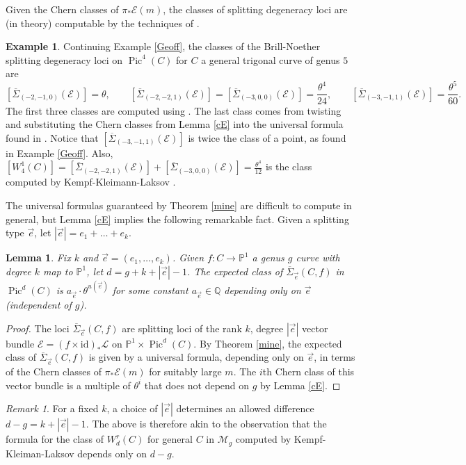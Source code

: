 \documentclass[12pt]{amsart}
\newcommand{\qq}{\mathbb{Q}}
\newcommand{\pp}{\mathbb{P}}
\newcommand{\E}{\mathcal{E}}
\renewcommand{\L}{\mathcal{L}}
\newcommand{\M}{\mathcal{M}}
\newtheorem{Lemma}[theorem]{Lemma}
\DeclareMathOperator{\Pic}{Pic}
\newcommand{\Sigmabar}{\overline{\Sigma}}
\theoremstyle{definition}
\newtheorem{Example}[theorem]{Example}
\theoremstyle{remark}
\newtheorem*{remark}{Remark}
\theoremstyle{remark}
\numberwithin{equation}{section}
\begin{document}
Given the Chern classes of $\pi_*\E(m)$, the classes of splitting degeneracy loci are (in theory) computable by the techniques of \cite{L}.
\begin{Example} \label{revisit}
Continuing Example \ref{Geoff}, the classes of the Brill-Noether splitting degeneracy loci on $\Pic^4(C)$ for $C$ a general trigonal curve of genus $5$ are
\[[\Sigmabar_{(-2, -1, 0)}(\E)] = \theta, \qquad [\Sigmabar_{(-2, -2, 1)}(\E)] = [\Sigmabar_{(-3, 0, 0)}(\E)] = \frac{\theta^4}{24}, \qquad [\Sigmabar_{(-3, -1, 1)}(\E)] = \frac{\theta^5}{60}.\]
The first three classes are computed using \cite[Lemma 5.1]{L}. The last class comes from twisting and substituting the Chern classes from Lemma \ref{cE} into the universal formula found in \cite[Example 6.2]{L}. Notice that $[\Sigmabar_{(-3, -1, 1)}(\E)]$ is twice the class of a point, as found in Example \ref{Geoff}.
Also, $[W^1_4(C)] = [\Sigmabar_{(-2, -2, 1)}(\E)] + [\Sigmabar_{(-3, 0, 0)}(\E)] = \frac{\theta^4}{12}$ is the class computed by Kempf-Kleimann-Laksov \cite{K, KL1, KL2}.
\end{Example}

The universal formulas guaranteed by Theorem \ref{mine} are difficult to compute in general, but Lemma \ref{cE} implies the following remarkable fact.
 Given a splitting type $\vec{e}$, let $|\vec{e}| = e_1 + \ldots + e_k$.


\begin{Lemma} \label{hoho}
Fix $k$ and $\vec{e} = (e_1, \ldots, e_k)$. Given $f\colon  C \rightarrow \pp^1$ a genus $g$ curve with degree $k$ map to $\pp^1$, let $d = g+k+ |\vec{e}| - 1$.
The expected class of $\overline{\Sigma}_{\vec{e}}(C,f)$ in $\Pic^d(C)$ is $a_{\vec{e}} \cdot \theta^{u(\vec{e})}$ for some constant $a_{\vec{e}} \in \qq$ depending only on $\vec{e}$ (independent of $g$).
\end{Lemma}
\begin{proof}
The loci $\overline{\Sigma}_{\vec{e}}(C,f)$ are splitting loci of the rank $k$, degree $|\vec{e}|$ vector bundle $\E = (f \times \mathrm{id})_* \L$ on $\pp^1 \times \Pic^d(C)$.
By Theorem \ref{mine}, the expected class of $\overline{\Sigma}_{\vec{e}}(C,f)$ is given by a universal formula, depending only on $\vec{e}$, in terms of the Chern classes of $\pi_* \E(m)$ for suitably large $m$. The $i$th Chern class of this vector bundle is a multiple of $\theta^i$ that does not depend on $g$ by Lemma \ref{cE}.
\end{proof}

\begin{remark}
For a fixed $k$, a choice of $|\vec{e}|$ determines an allowed difference $d - g = k+|\vec{e}| - 1$. The above is therefore akin to the observation that the formula for the class of $W^r_d(C)$ for general $C$ in $\M_g$ computed by Kempf-Kleiman-Laksov \cite{K, KL1, KL2} depends only on $d - g$.
\end{remark}
\end{document}
